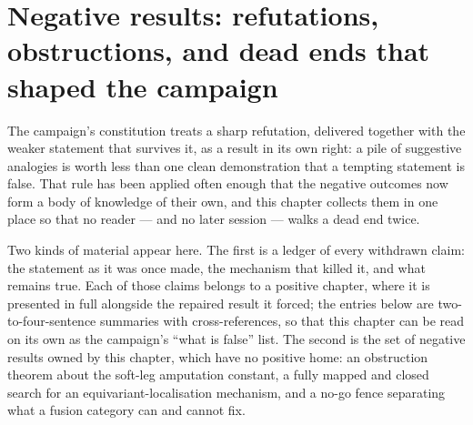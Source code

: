 
\section{Negative results: refutations, obstructions, and dead ends that shaped the campaign}
\label{sec:negative-results}

\newcommand{\Irrsimple}{\operatorname{Irr}}    %
\newcommand{\Funcat}{\operatorname{Fun}}       %
\newcommand{\Dendp}{\mathcal{D}_{\mathcal{M}}} %

The campaign's constitution treats a sharp refutation, delivered together with
the weaker statement that survives it, as a result in its own right: a pile of
suggestive analogies is worth less than one clean demonstration that a
tempting statement is false. That rule has been applied often enough that the
negative outcomes now form a body of knowledge of their own, and this chapter
collects them in one place so that no reader — and no later session — walks a
dead end twice.

Two kinds of material appear here. The first is a ledger of every withdrawn
claim: the statement as it was once made, the mechanism that killed it, and
what remains true. Each of those claims belongs to a positive chapter, where
it is presented in full alongside the repaired result it forced; the entries
below are two-to-four-sentence summaries with cross-references, so that this
chapter can be read on its own as the campaign's ``what is false'' list. The
second is the set of negative results owned by this chapter, which have no
positive home: an obstruction theorem about the soft-leg amputation constant,
a fully mapped and closed search for an equivariant-localisation mechanism,
and a no-go fence separating what a fusion category can and cannot fix.

